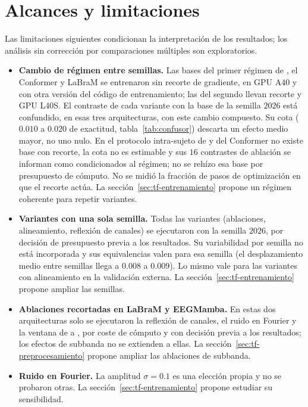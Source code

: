 \section{Alcances y limitaciones}
\label{sec:limitaciones}

Las limitaciones siguientes condicionan la interpretación de los resultados; los análisis sin corrección
por comparaciones múltiples son exploratorios.

\begin{itemize}
  \item \textbf{Cambio de régimen entre semillas.} Las bases del primer régimen de \eegnet{}, el Conformer y
        LaBraM se entrenaron sin recorte de gradiente, en GPU A40 y con otra versión del código de entrenamiento; las del segundo llevan recorte y GPU L40S. El contraste de cada variante con la base de la
        semilla $2026$ está confundido, en esas tres arquitecturas, con este cambio compuesto. Su cota
        ($0.010$ a $0.020$ de exactitud, tabla~\ref{tab:confusor}) descarta un efecto medio mayor, no uno nulo.
        En el protocolo intra-sujeto de \eegnet{} y del Conformer no existe base con recorte, la cota no es
        estimable y sus $16$ contrastes de ablación se informan como condicionados al régimen; no se
        rehízo esa base por presupuesto de cómputo. No se midió la fracción de pasos de
        optimización en que el recorte actúa. La sección~\ref{sec:tf-entrenamiento} propone un régimen coherente para repetir variantes.
  \item \textbf{Variantes con una sola semilla.} Todas las variantes (ablaciones, alineamiento, reflexión de
        canales) se ejecutaron con la semilla $2026$, por decisión de presupuesto previa a los resultados.
        Su variabilidad por semilla no está incorporada y sus equivalencias valen para esa semilla (el
        desplazamiento medio entre semillas llega a $0.008$ a $0.009$). Lo mismo vale para las variantes con
        alineamiento en la validación externa. La sección~\ref{sec:tf-entrenamiento} propone ampliar las semillas.
  \item \textbf{Ablaciones recortadas en LaBraM y EEGMamba.} En estas dos arquitecturas solo se ejecutaron la
        reflexión de canales, el ruido en Fourier y la ventana de  a , por coste de cómputo y
        con decisión previa a los resultados; los efectos de subbanda no se extienden a ellas. La sección~\ref{sec:tf-preprocesamiento} propone ampliar las ablaciones de subbanda.
  \item \textbf{Ruido en Fourier.} La amplitud $\sigma = 0.1$ es una elección propia y no se probaron otras. La sección~\ref{sec:tf-entrenamiento} propone estudiar su sensibilidad.

\end{itemize}
